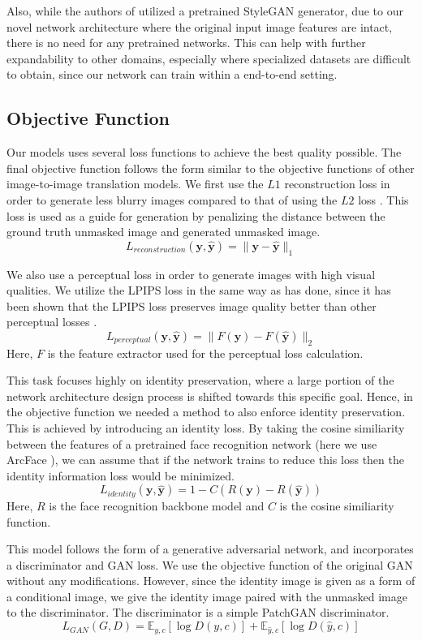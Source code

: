 \documentclass[sigconf]{acmart}
\begin{document}
Also, while the authors of \cite{PSP} utilized a pretrained StyleGAN generator, due to our
novel network architecture where the original input image features are intact, there is no
need for any pretrained networks. This can help with further expandability to other domains,
especially where specialized datasets are difficult to obtain, since our network can train 
within a end-to-end setting. 

\subsection{Objective Function}
Our models uses several loss functions to achieve the best quality possible. The final
objective function follows the form similar to the objective functions of other image-to-image
translation models.
We first use the $L1$ reconstruction loss in order to generate less blurry images
compared to that of using the $L2$ loss \cite{L1, Pix2Pix}. This loss is used as a
guide for generation by penalizing the distance between the ground truth unmasked image and
generated unmasked image.
\[
    L_{reconstruction}(\mathbf{y}, \mathbf{\hat{y}}) = \|\mathbf{y} - \mathbf{\hat{y}}\|_1
\]

We also use a perceptual loss in order to generate images with high visual qualities. We
utilize the LPIPS loss \cite{LPIPS} in the same way as \cite{PSP} has done,
since it has been shown that the LPIPS
loss preserves image quality better than other perceptual losses \cite{LPIPS2}.
\[
    L_{perceptual}(\mathbf{y}, \mathbf{\hat{y}}) = \|F(\mathbf{y}) - F(\mathbf{\hat{y}})\|_2
\]
Here, $F$ is the feature extractor used for the perceptual loss calculation.

This task focuses highly on identity preservation, where a large portion of the network
architecture design process is shifted towards this specific goal. Hence, in the objective
function we needed a method to also enforce identity preservation. This is achieved by
introducing an identity loss. By taking the cosine similiarity between the features of
a pretrained face recognition network (here we use ArcFace \cite{Arcface}), we can assume
that if the network trains to reduce this loss then the identity information loss would be
minimized.
\[
    L_{identity}(\mathbf{y}, \mathbf{\hat{y}}) = 1- C(R(\mathbf{y}) - R(\mathbf{\hat{y}}))
\]
Here, $R$ is the face recognition backbone model and $C$ is the cosine similiarity
function.

This model follows the form of a generative adversarial network, and incorporates a discriminator
and GAN loss. We use the objective function of the original GAN without any modifications.
However, since the identity image is given as a form of a conditional image, we give the
identity image paired with the unmasked image to the discriminator.
The discriminator is a simple PatchGAN \cite{PatchGAN} discriminator.
\[
    L_{GAN} (G, D) = \mathbb{E}_{y, c}\left[\log D(y, c)\right] + \mathbb{E}_{\hat{y}, c}\left[\log D(\hat{y}, c)\right]
\]
\end{document}
